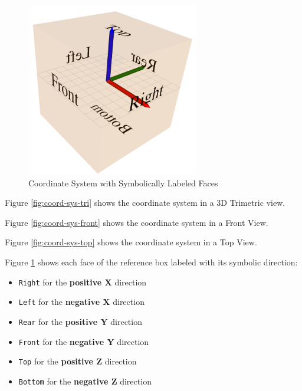 \documentclass [11pt]{book}
\begin{document}
\begin{figure}
\begin{center}
\includegraphics[width=3in,height=3in]{../images/coord-sys-labeled-faces.png}
\end{center}

\caption{Coordinate System with Symbolically Labeled Faces}

\label{fig:coord-sys-labeled-faces}

\end{figure}


Figure 
\ref{fig:coord-sys-tri} shows the coordinate system in a 3D Trimetric view.



Figure 
\ref{fig:coord-sys-front} shows the coordinate system in a Front View.



Figure 
\ref{fig:coord-sys-top} shows the coordinate system in a Top View.



Figure 
\ref{fig:coord-sys-labeled-faces} shows each face of the reference box labeled with its symbolic direction:

\begin{itemize}

\item \texttt{Right} for the 
\textbf{positive X} direction

\item \texttt{Left} for the 
\textbf{negative X} direction

\item \texttt{Rear} for the 
\textbf{positive Y} direction

\item \texttt{Front} for the 
\textbf{negative Y} direction

\item \texttt{Top} for the 
\textbf{positive Z} direction

\item \texttt{Bottom} for the 
\textbf{negative Z} direction

\end{itemize}
\end{document}
